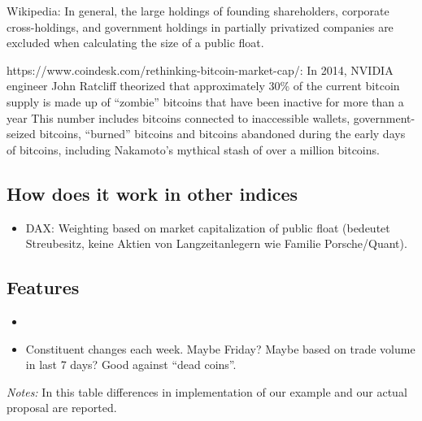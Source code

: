 \documentclass[11pt]{article}
\newcommand\fnotes[1]{\captionsetup{font=scriptsize}\caption*{\textsl{Notes:} #1}}
\begin{document}
Wikipedia:  In general, the large holdings of founding shareholders, corporate cross-holdings, and government holdings in partially privatized companies are excluded when calculating the size of a public float.

https://www.coindesk.com/rethinking-bitcoin-market-cap/: In 2014, NVIDIA engineer John Ratcliff theorized that approximately 30\% of the current bitcoin supply is made up of ``zombie'' bitcoins that have been inactive for more than a year This number includes bitcoins connected to inaccessible wallets, government-seized bitcoins, ``burned'' bitcoins and bitcoins abandoned during the early days of bitcoins, including Nakamoto's mythical stash of over a million bitcoins.

\subsection{How does it work in other indices}

\begin{itemize}
  \item DAX: Weighting based on market capitalization of public float (bedeutet Streubesitz, keine Aktien von Langzeitanlegern  wie Familie Porsche/Quant).
\end{itemize}

\subsection{Features}

\begin{itemize}
  \item
  \item Constituent changes each week. Maybe Friday? Maybe based on trade volume in last 7 days? Good against ``dead coins''.
\end{itemize}

\begin{table*}
\caption{Table explaining differences: proposal vs.\ example}
\centering
{}
\fnotes{In this table differences in implementation of our example and our actual proposal are reported.}
\end{table*}
\end{document}
